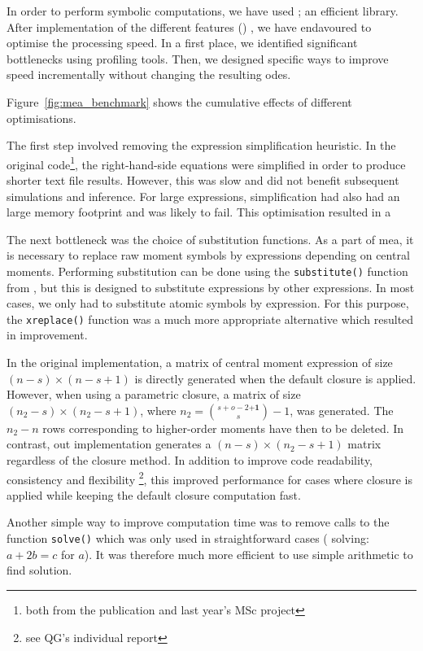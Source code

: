 In order to perform symbolic computations, we have used \sympy{} \cite{sympy_development_team_sympy:_2014}; an efficient \py{} library.
After implementation of the different features ()
, we have endavoured to optimise the processing speed.
In a first place, we identified significant bottlenecks using \py{} profiling tools.
Then, we designed specific ways to improve speed incrementally without changing the resulting \gls{ode}s.

Figure~\ref{fig:mea_benchmark} shows the cumulative effects of different optimisations.




The first step involved removing the expression simplification heuristic.
In the original code\footnote{both from the publication and last year's MSc project}, the right-hand-side equations were simplified in order to produce shorter text file results.
However, this was slow and did not benefit subsequent simulations and inference.
For large expressions, simplification had also had an large memory footprint and was likely to fail.
This optimisation resulted in a  %

The next bottleneck was the choice of substitution functions.
As a part of \gls{mea}, it is necessary to replace raw moment symbols by expressions depending on central moments.
Performing substitution can be done using the \texttt{substitute()} function from \sympy, but this is designed to substitute expressions by other expressions.
In most cases, we only had to substitute atomic symbols by expression.
For this purpose, the  \texttt{xreplace()} function was a much more appropriate alternative which resulted in  improvement.

In the original implementation, a matrix of central moment expression of size $(n-s) \times (n-s + 1)$ is directly generated when the default closure is applied.
However, when using a parametric closure, a matrix of size $(n_2-s) \times (n_2-s + 1)$, where $n_2={{s+o-2 \mathbf{+1}} \choose {s}} -1$, was generated.
The $n_2 - n$ rows corresponding to higher-order moments have then to be deleted.
In contrast, out implementation generates a $(n-s) \times (n_2-s + 1)$ matrix regardless of the closure method.
In addition to improve code readability, consistency and flexibility \footnote{see QG's individual report}, this improved performance for cases where closure is applied while keeping the default closure computation fast.

Another simple way to improve computation time was to remove calls to the function \texttt{solve()} which was only used in straightforward cases (\eg{} solving: $a + 2b = c$ for $a$).
It was therefore much more efficient to use simple arithmetic to find solution.

